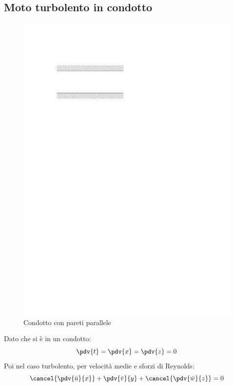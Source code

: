 \subsection{Moto turbolento in condotto}
	\begin{figure}[ht]
		\includegraphics[scale=0.6]{./8.2 Equazioni del moto turbolento/8.2-1}
		\centering
		\caption{Condotto con pareti parallele}
	\end{figure}
%
Dato che si è in un condotto:
%
	\begin{equation*}
		\pdv{t} = \pdv{x} = \pdv{z} = 0
	\end{equation*}
%
Poi nel caso turbolento, per velocità medie e sforzi di Reynolds:
%
	\begin{equation*}
		\cancel{\pdv{\bar{u}}{x}} + \pdv{\bar{v}}{y} + \cancel{\pdv{\bar{w}}{z}} = 0
	\end{equation*}
%

